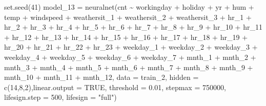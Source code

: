 \documentclass[
]{article}
\newenvironment{Shaded}{\begin{snugshade}}{\end{snugshade}}
\newcommand{\AttributeTok}[1]{\textcolor[rgb]{0.77,0.63,0.00}{#1}}
\newcommand{\ConstantTok}[1]{\textcolor[rgb]{0.00,0.00,0.00}{#1}}
\newcommand{\DecValTok}[1]{\textcolor[rgb]{0.00,0.00,0.81}{#1}}
\newcommand{\FloatTok}[1]{\textcolor[rgb]{0.00,0.00,0.81}{#1}}
\newcommand{\FunctionTok}[1]{\textcolor[rgb]{0.00,0.00,0.00}{#1}}
\newcommand{\NormalTok}[1]{#1}
\newcommand{\OtherTok}[1]{\textcolor[rgb]{0.56,0.35,0.01}{#1}}
\newcommand{\SpecialCharTok}[1]{\textcolor[rgb]{0.00,0.00,0.00}{#1}}
\newcommand{\StringTok}[1]{\textcolor[rgb]{0.31,0.60,0.02}{#1}}
\begin{document}
\begin{Shaded}
\begin{Highlighting}[]
\FunctionTok{set.seed}\NormalTok{(}\DecValTok{41}\NormalTok{)}
\NormalTok{model\_13 }\OtherTok{=} \FunctionTok{neuralnet}\NormalTok{(cnt }\SpecialCharTok{\textasciitilde{}}\NormalTok{ workingday }\SpecialCharTok{+}\NormalTok{ holiday }\SpecialCharTok{+}\NormalTok{ yr }\SpecialCharTok{+}\NormalTok{ hum }\SpecialCharTok{+}\NormalTok{ temp }\SpecialCharTok{+}\NormalTok{ windspeed }\SpecialCharTok{+}\NormalTok{ weathersit\_1 }\SpecialCharTok{+}\NormalTok{ weathersit\_2 }\SpecialCharTok{+}\NormalTok{ weathersit\_3 }\SpecialCharTok{+}\NormalTok{ hr\_1 }\SpecialCharTok{+}\NormalTok{ hr\_2 }\SpecialCharTok{+}\NormalTok{ hr\_3 }\SpecialCharTok{+}\NormalTok{ hr\_4 }\SpecialCharTok{+}\NormalTok{ hr\_5 }\SpecialCharTok{+}\NormalTok{ hr\_6 }\SpecialCharTok{+}\NormalTok{ hr\_7 }\SpecialCharTok{+}\NormalTok{ hr\_8 }\SpecialCharTok{+}\NormalTok{ hr\_9 }\SpecialCharTok{+}\NormalTok{ hr\_10 }\SpecialCharTok{+}\NormalTok{ hr\_11 }\SpecialCharTok{+}\NormalTok{ hr\_12 }\SpecialCharTok{+}\NormalTok{ hr\_13 }\SpecialCharTok{+}\NormalTok{ hr\_14 }\SpecialCharTok{+}\NormalTok{ hr\_15 }\SpecialCharTok{+}\NormalTok{ hr\_16 }\SpecialCharTok{+}\NormalTok{ hr\_17 }\SpecialCharTok{+}\NormalTok{ hr\_18 }\SpecialCharTok{+}\NormalTok{ hr\_19 }\SpecialCharTok{+}\NormalTok{ hr\_20 }\SpecialCharTok{+}\NormalTok{ hr\_21 }\SpecialCharTok{+}\NormalTok{ hr\_22 }\SpecialCharTok{+}\NormalTok{ hr\_23 }\SpecialCharTok{+}\NormalTok{ weekday\_1 }\SpecialCharTok{+}\NormalTok{ weekday\_2 }\SpecialCharTok{+}\NormalTok{ weekday\_3 }\SpecialCharTok{+}\NormalTok{ weekday\_4 }\SpecialCharTok{+}\NormalTok{ weekday\_5 }\SpecialCharTok{+}\NormalTok{ weekday\_6 }\SpecialCharTok{+}\NormalTok{ weekday\_7 }\SpecialCharTok{+}\NormalTok{ mnth\_1 }\SpecialCharTok{+}\NormalTok{ mnth\_2 }\SpecialCharTok{+}\NormalTok{ mnth\_3 }\SpecialCharTok{+}\NormalTok{ mnth\_4 }\SpecialCharTok{+}\NormalTok{ mnth\_5 }\SpecialCharTok{+}\NormalTok{ mnth\_6 }\SpecialCharTok{+}\NormalTok{ mnth\_7 }\SpecialCharTok{+}\NormalTok{ mnth\_8 }\SpecialCharTok{+}\NormalTok{ mnth\_9 }\SpecialCharTok{+}\NormalTok{ mnth\_10 }\SpecialCharTok{+}\NormalTok{ mnth\_11 }\SpecialCharTok{+}\NormalTok{ mnth\_12, }\AttributeTok{data =}\NormalTok{ train\_2, }\AttributeTok{hidden =} \FunctionTok{c}\NormalTok{(}\DecValTok{14}\NormalTok{,}\DecValTok{8}\NormalTok{,}\DecValTok{2}\NormalTok{),}\AttributeTok{linear.output =} \ConstantTok{TRUE}\NormalTok{, }\AttributeTok{threshold =} \FloatTok{0.01}\NormalTok{, }\AttributeTok{stepmax =} \DecValTok{750000}\NormalTok{, }\AttributeTok{lifesign.step =} \DecValTok{500}\NormalTok{, }\AttributeTok{lifesign =} \StringTok{"full"}\NormalTok{)}
\end{Highlighting}
\end{Shaded}
\end{document}
